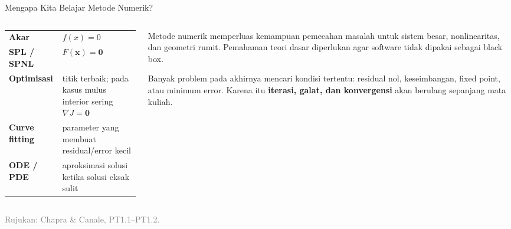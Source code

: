 \documentclass[aspectratio=169,10pt]{beamer}
\newcommand{\smallgray}[1]{\textcolor{GrayText}{\scriptsize #1}}
\begin{document}
\begin{frame}{Mengapa Kita Belajar Metode Numerik?}
\scriptsize
\begin{columns}[T,totalwidth=\textwidth]
\begin{column}{.48\textwidth}
\begin{bluebox}
\begin{tabularx}{\linewidth}{>{\bfseries}p{.31\linewidth} X}
Akar & $f(x)=0$ \\
SPL / SPNL & $F(\mathbf{x})=\mathbf{0}$ \\
Optimisasi & titik terbaik; pada kasus mulus interior sering $\nabla J=\mathbf{0}$ \\
Curve fitting & parameter yang membuat residual/error kecil \\
ODE / PDE & aproksimasi solusi ketika solusi eksak sulit \\
\end{tabularx}
\end{bluebox}
\end{column}
\begin{column}{.48\textwidth}
\begin{orangebox}
Metode numerik memperluas kemampuan pemecahan masalah untuk sistem besar, nonlinearitas, dan geometri rumit. Pemahaman teori dasar diperlukan agar software tidak dipakai sebagai black box.
\end{orangebox}
\begin{purplebox}
Banyak problem pada akhirnya mencari kondisi tertentu: residual nol, keseimbangan, fixed point, atau minimum error. Karena itu \textbf{iterasi, galat, dan konvergensi} akan berulang sepanjang mata kuliah.
\end{purplebox}
\end{column}
\end{columns}
\vfill
\smallgray{Rujukan: Chapra \& Canale, PT1.1--PT1.2.}
\end{frame}
\end{document}
